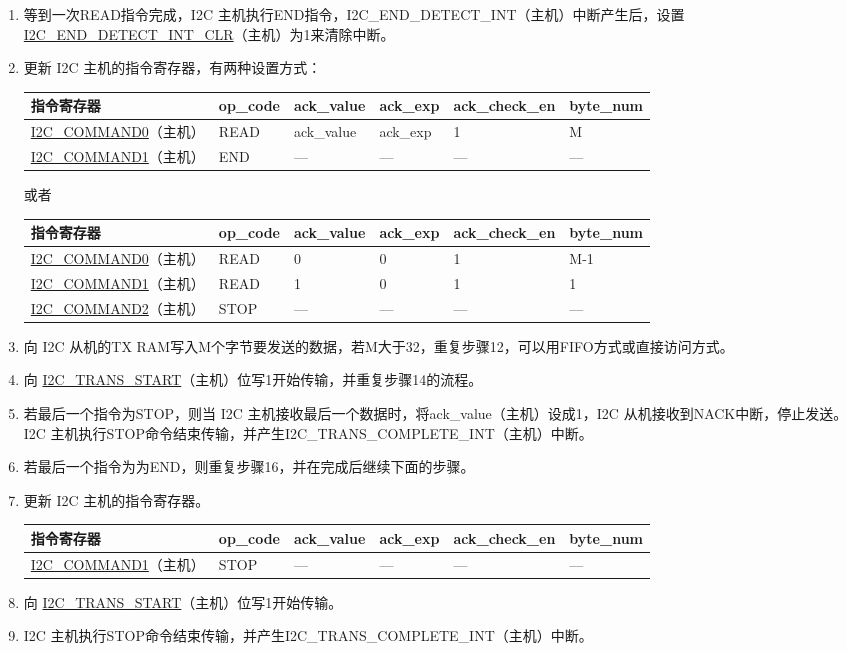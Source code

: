 \documentclass[main\_\_CN.tex]{subfiles}
\begin{document}
\begin{enumerate}
\item 等到一次READ指令完成，I2C 主机执行END指令，I2C\_END\_DETECT\_INT（主机）中断产生后，设置\hyperref[fielddesc:I2CENDDETECTINTCLR]{I2C\_END\_DETECT\_INT\_CLR}（主机）为1来清除中断。
\item 更新 I2C 主机的指令寄存器，有两种设置方式：
\begin{longtable}{ | p{4cm} | p{2cm} | p{2cm} | p{2cm} |p{2cm} | p{2cm} |}
\hline\rowcolor{lightgray}
指令寄存器& op\_code & ack\_value&ack\_exp&ack\_check\_en&byte\_num  \\ \hline
\hyperref[fielddesc:I2CCOMMAND0]{I2C\_COMMAND0}（主机）& READ& ack\_value&ack\_exp&1&M  \\ \hline
\hyperref[fielddesc:I2CCOMMAND1]{I2C\_COMMAND1}（主机）& END& ---&---&---&---  \\ \hline
\end{longtable} 
或者
\begin{longtable}{ | p{4cm} | p{2cm} | p{2cm} | p{2cm} |p{2cm} | p{2cm} |}
\hline\rowcolor{lightgray}
指令寄存器& op\_code & ack\_value&ack\_exp&ack\_check\_en&byte\_num  \\ \hline
\hyperref[fielddesc:I2CCOMMAND0]{I2C\_COMMAND0}（主机）& READ& 0&0&1&M-1  \\ \hline
\hyperref[fielddesc:I2CCOMMAND1]{I2C\_COMMAND1}（主机）& READ& 1&0&1&1  \\ \hline
\hyperref[fielddesc:I2CCOMMAND2]{I2C\_COMMAND2}（主机）& STOP& ---&---&---&---  \\ \hline
\end{longtable} 

\item 向 I2C 从机的TX RAM写入M个字节要发送的数据，若M大于32，重复步骤12，可以用FIFO方式或直接访问方式。
\item 向 \hyperref[fielddesc:I2CTRANSSTART]{I2C\_TRANS\_START}（主机）位写1开始传输，并重复步骤14的流程。
\item 若最后一个指令为STOP，则当 I2C 主机接收最后一个数据时，将ack\_value（主机）设成1，I2C 从机接收到NACK中断，停止发送。 I2C 主机执行STOP命令结束传输，并产生I2C\_TRANS\_COMPLETE\_INT（主机）中断。
\item 若最后一个指令为为END，则重复步骤16，并在完成后继续下面的步骤。
\item 更新 I2C 主机的指令寄存器。
\begin{longtable}{ | p{4cm} | p{2cm} | p{2cm} | p{2cm} |p{2cm} | p{2cm} |}
\hline\rowcolor{lightgray}
指令寄存器& op\_code & ack\_value&ack\_exp&ack\_check\_en&byte\_num  \\ \hline
\hyperref[fielddesc:I2CCOMMAND1]{I2C\_COMMAND1}（主机）& STOP& ---&---&---&---  \\ \hline
\end{longtable} 
\item 向 \hyperref[fielddesc:I2CTRANSSTART]{I2C\_TRANS\_START}（主机）位写1开始传输。
\item I2C 主机执行STOP命令结束传输，并产生I2C\_TRANS\_COMPLETE\_INT（主机）中断。

\end{enumerate}
\end{document}
